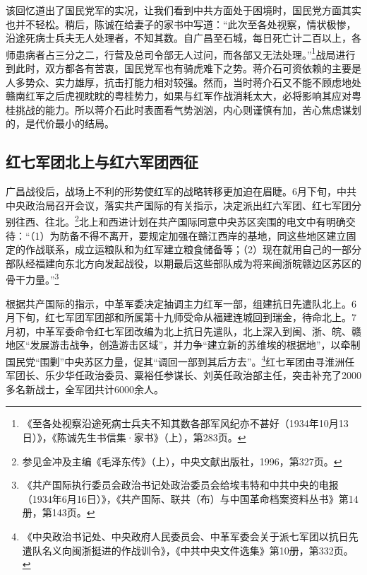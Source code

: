 该回忆道出了国民党军的实况，让我们看到中共方面处于困境时，国民党方面其实也并不轻松。稍后，陈诚在给妻子的家书中写道：“此次至各处视察，情状极惨，沿途死病士兵夫无人处理者，不知其数。自广昌至石城，每日死亡计二百以上，各师患病者占三分之二，行营及总司令部无人过问，而各部又无法处理。”\footnote{《至各处视察沿途死病士兵夫不知其数各部军风纪亦不甚好（1934年10月13日）》，《陈诚先生书信集·家书》（上），第283页。}战局进行到此时，双方都各有苦衷，国民党军也有骑虎难下之势。蒋介石可资依赖的主要是人多势众、实力雄厚，抗击打能力相对较强。然而，当时蒋介石又不能不顾虑地处赣南红军之后虎视眈眈的粤桂势力，如果与红军作战消耗太大，必将影响其应对粤桂挑战的能力。所以蒋介石此时表面看气势汹汹，内心则谨慎有加，苦心焦虑谋划的，是代价最小的结局。

\subsection{红七军团北上与红六军团西征}


广昌战役后，战场上不利的形势使红军的战略转移更加迫在眉睫。6月下旬，中共中央政治局召开会议，落实共产国际的有关指示，决定派出红六军团、红七军团分别往西、往北。\footnote{参见金冲及主编《毛泽东传》（上），中央文献出版社，1996，第327页。}北上和西进计划在共产国际同意中央苏区突围的电文中有明确交待：“（1）为防备不得不离开，要规定加强在赣江西岸的基地，同这些地区建立固定的作战联系，成立运粮队和为红军建立粮食储备等；（2）现在就用自己的一部分部队经福建向东北方向发起战役，以期最后这些部队成为将来闽浙皖赣边区苏区的骨干力量。”\footnote{《共产国际执行委员会政治书记处政治委员会给埃韦特和中共中央的电报（1934年6月16日）》，《共产国际、联共（布）与中国革命档案资料丛书》第14册，第143页。}


根据共产国际的指示，中革军委决定抽调主力红军一部，组建抗日先遣队北上。6月下旬，红七军团军团部和所属第十九师受命从福建连城回到瑞金，待命北上。7月初，中革军委命令红七军团改编为北上抗日先遣队，北上深入到闽、浙、皖、赣地区“发展游击战争，创造游击区域”，并力争“建立新的苏维埃的根据地”，以牵制国民党“围剿”中央苏区力量，促其“调回一部到其后方去”。\footnote{《中央政治书记处、中央政府人民委员会、中革军委会关于派七军团以抗日先遣队名义向闽浙挺进的作战训令》，《中共中央文件选集》第10册，第332页。}红七军团由寻淮洲任军团长、乐少华任政治委员、粟裕任参谋长、刘英任政治部主任，突击补充了2000多名新战士，全军团共计6000余人。


